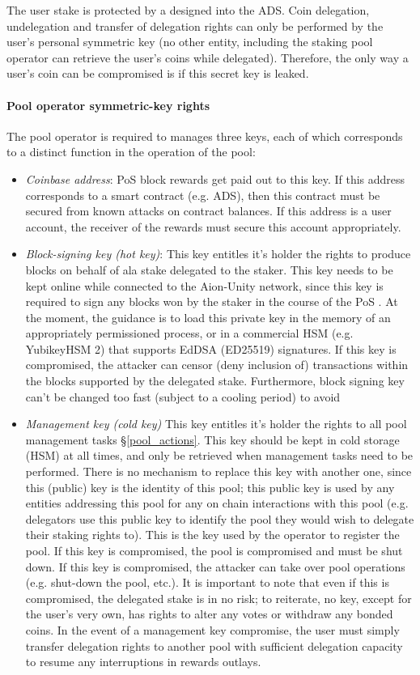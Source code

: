 The user stake is protected by a  designed into the ADS. Coin delegation, undelegation and transfer of delegation rights can only be performed by the user's personal symmetric key (no other entity, including the staking pool operator can retrieve the user's coins while delegated). Therefore, the only way a user's coin can be compromised is if this secret key is leaked.  
    
\paragraph{Pool operator symmetric-key rights} The pool operator is required to manages three keys, each of which corresponds to a distinct function in the operation of the pool: 
\begin{itemize}
    \item \textit{Coinbase address}: PoS block rewards get paid out to this key. If this address corresponds to a smart contract (e.g. ADS), then this contract must be secured from known attacks on contract balances. If this address is a user account, the receiver of the rewards must secure this account appropriately.  
    \item \textit{Block-signing key (hot key)}: This key entitles it's holder the rights to produce blocks on behalf of ala stake delegated to the staker. This key needs to be kept online while connected to the Aion-Unity network, since this key is required to sign any blocks won by the staker in the course of the PoS . At the moment, the guidance is to load this private key in the memory of an appropriately permissioned process, or in a commercial HSM (e.g. YubikeyHSM 2) that supports EdDSA (ED25519) signatures. If this key is compromised, the attacker can censor (deny inclusion of) transactions within the blocks supported by the delegated stake. Furthermore, block signing key can't be changed too fast (subject to a cooling period) to avoid 
    \item \textit{Management key (cold key)} This key entitles it's holder the rights to all pool management tasks \S\ref{pool_actions}. This key should be kept in cold storage (HSM) at all times, and only be retrieved when management tasks need to be performed. There is no mechanism to replace this key with another one, since this (public) key is the identity of this pool; this public key is used by any entities addressing this pool for any on chain interactions with this pool (e.g. delegators use this public key to identify the pool they would wish to delegate their staking rights to). This is the key used by the operator to register the pool. If this key is compromised, the pool is compromised and must be shut down. If this key is compromised, the attacker can take over pool operations (e.g. shut-down the pool, etc.). It is important to note that even if this  is compromised, the delegated stake is in no risk; to reiterate, no key, except for the user's very own, has rights to alter any votes or withdraw any bonded coins. In the event of a management key compromise, the user must simply transfer delegation rights to another pool with sufficient delegation capacity to resume any interruptions in rewards outlays. 
\end{itemize}

